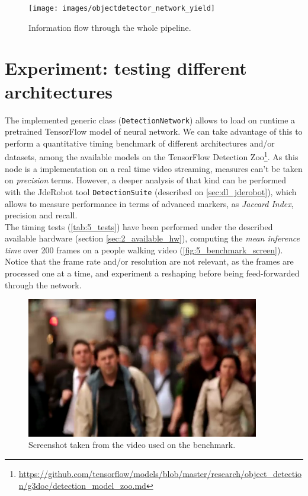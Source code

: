 		\begin{figure}[h!]
			\centering
			\texttt{[image: images/objectdetector\_network\_yield]}
			\caption{Information flow through the whole pipeline.}
			\label{fig:5_whole_pipeline}
		\end{figure}

\vspace{3.5in}
\section{Experiment: testing different architectures}
	The implemented generic class (\texttt{DetectionNetwork}) allows to load on runtime a pretrained TensorFlow model of neural network. We can take advantage of this to perform a quantitative timing benchmark of different architectures and/or datasets, among the available models on the TensorFlow Detection Zoo\footnote{\url{https://github.com/tensorflow/models/blob/master/research/object_detection/g3doc/detection_model_zoo.md}}. As this node is a implementation on a real time video streaming, measures can't be taken on \emph{precision} terms. However, a deeper analysis of that kind can be performed with the JdeRobot tool \texttt{DetectionSuite} (described on \autoref{sec:dl_jderobot}), which allows to measure performance in terms of advanced markers, as \emph{Jaccard Index}, precision and recall.\\
	
	The timing tests (\autoref{tab:5_tests}) have been performed under the described available hardware (section \ref{sec:2_available_hw}), computing the \emph{mean inference time} over 200 frames on a people walking video (\autoref{fig:5_benchmark_screen}). Notice that the frame rate and/or resolution are not relevant, as the frames are processed one at a time, and experiment a reshaping before being feed-forwarded through the network.
	
	\begin{figure}[h]
		\centering
		\includegraphics[width=4in]{images/net_benchmarking_screenshot}
		\caption{Screenshot taken from the video used on the benchmark.}
		\label{fig:5_benchmark_screen}
	\end{figure}
	
